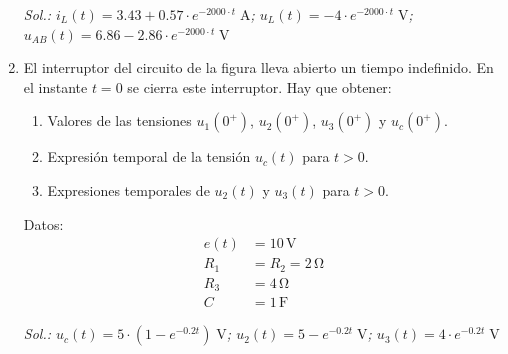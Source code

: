 \begin{enumerate}
\vspace{2mm}
\emph{Sol.:\; $i_L(t) = 3.43 + 0.57 \cdot e^{-2000 \cdot t} \;\unit{\ampere}$;\;
  $u_L(t) = - 4 \cdot e^{-2000 \cdot t} \;\unit{\volt}$;\;
  $u_{AB}(t) = 6.86 - 2.86 \cdot e^{-2000 \cdot t} \;\unit{\volt}$
}

\item El interruptor del circuito de la figura lleva abierto un tiempo
  indefinido. En el instante $t= 0$ se cierra este interruptor. Hay
  que obtener:
  \begin{enumerate}
  \item Valores de las tensiones $u_1(0^+)$, $u_2(0^+)$, $u_3(0^+)$ y
    $u_c(0^+)$.
  \item Expresión temporal de la tensión $u_c(t)$ para $t > 0$.
  \item Expresiones temporales de $u_2(t)$ y $u_3(t)$ para $t > 0$.
  \end{enumerate}

\begin{minipage}{0.5\linewidth}
\end{minipage}
\begin{minipage}{0.5\linewidth}
 \hspace{20mm} Datos:
    \begin{align*}
    e(t) &= 10\,\unit{\volt}\\
    R_1 &= R_2 = 2 \,\unit{\ohm}\\
    R_3 &= 4 \,\unit{\ohm}\\
    C &= 1 \,\unit{\farad}
  \end{align*}
\end{minipage}

\emph{Sol.:\; $u_c(t) = 5 \cdot(1 - e^{-0.2t}) \;\unit{\volt}$;\;
  $u_2(t) = 5 - e^{-0.2t} \;\unit{\volt}$;\;
  $u_3(t) = 4 \cdot e^{-0.2t} \;\unit{\volt}$}


\end{enumerate}
